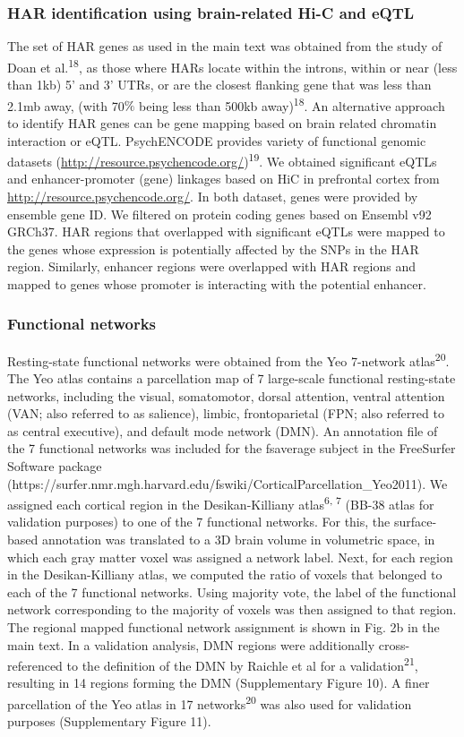 \begin{refsection}
\subsubsection*{HAR identification using brain-related Hi-C and eQTL}
The set of HAR genes as used in the main text was obtained from the study of Doan et al.\textsuperscript{18}, as those where HARs locate within the introns, within or near (less than 1kb) 5' and 3' UTRs, or are the closest flanking gene that was less than 2.1mb away, (with 70$\%$  being less than 500kb away)\textsuperscript{18}. An alternative approach to identify HAR genes can be gene mapping based on brain related chromatin interaction or eQTL. PsychENCODE provides variety of functional genomic datasets (\href{http://resource.psychencode.org/}{http://resource.psychencode.org/})\textsuperscript{19}. We obtained significant eQTLs and enhancer-promoter (gene) linkages based on HiC in prefrontal cortex from \href{http://resource.psychencode.org/}{http://resource.psychencode.org/}. In both dataset, genes were provided by ensemble gene ID. We filtered on protein coding genes based on Ensembl v92 GRCh37. HAR regions that overlapped with significant eQTLs were mapped to the genes whose expression is potentially affected by the SNPs in the HAR region. Similarly, enhancer regions were overlapped with HAR regions and mapped to genes whose promoter is interacting with the potential enhancer.

\subsubsection*{Functional networks}
Resting-state functional networks were obtained from the Yeo 7-network atlas\textsuperscript{20}. The Yeo atlas contains a parcellation map of 7 large-scale functional resting-state networks, including the visual, somatomotor, dorsal attention, ventral attention (VAN; also referred to as salience), limbic, frontoparietal (FPN; also referred to as central executive), and default mode network (DMN). An annotation file of the 7 functional networks was included for the fsaverage subject in the FreeSurfer Software package (https://surfer.nmr.mgh.harvard.edu/fswiki/CorticalParcellation\_Yeo2011). We assigned each cortical region in the Desikan-Killiany atlas\textsuperscript{6, 7} (BB-38 atlas for validation purposes) to one of the 7 functional networks. For this, the surface-based annotation was translated to a 3D brain volume in volumetric space, in which each gray matter voxel was assigned a network label. Next, for each region in the Desikan-Killiany atlas, we computed the ratio of voxels that belonged to each of the 7 functional networks. Using majority vote, the label of the functional network corresponding to the majority of voxels was then assigned to that region. The regional mapped functional network assignment is shown in Fig. 2b in the main text. In a validation analysis, DMN regions were additionally cross-referenced to the definition of the DMN by Raichle et al for a validation\textsuperscript{21}, resulting in 14 regions forming the DMN (Supplementary Figure 10). A finer parcellation of the Yeo atlas in 17 networks\textsuperscript{20} was also used for validation purposes (Supplementary Figure 11).


\end{refsection}
